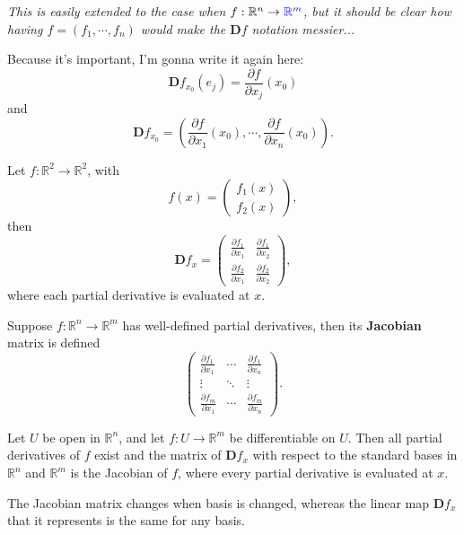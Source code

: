 \documentclass[10pt]{report}
\begin{document}
\textit{This is easily extended to the case when $f: \mathbb{R}^n \to {\color{blue}\mathbb{R}^m}$, but it should be clear how having $f=(f_1, \cdots, f_n)$ would make the $\mathbf{D}f$ notation messier...}

\begin{note}[]
Because it's important, I'm gonna write it again here:
\[
	\mathbf{D}f_{x_0}(e_j) = \frac{\partial f}{\partial x_j} (x_0)
\] 
and
\[
\mathbf{D}f_{x_0} = \left( \frac{\partial f}{\partial x_1} (x_0), \cdots, \frac{\partial f}{\partial x_n} (x_0) \right).
\] 
\end{note}

\begin{ex}[]
Let $f: \mathbb{R}^2 \to \mathbb{R}^2$, with
\[
	f(x) = 
	\begin{pmatrix}
		f_1(x) \\
		f_2(x)
	\end{pmatrix},
\] then
\[
\mathbf{D}f_{x} =
\begin{pmatrix}
	\frac{\partial f_1}{\partial x_1} & \frac{\partial f_1}{\partial x_2} \\
	\frac{\partial f_2}{\partial x_1} & \frac{\partial f_2}{\partial x_2}
\end{pmatrix},
\] where each partial derivative is evaluated at $x$.
\end{ex}

\begin{defn}[]
Suppose $f:\mathbb{R}^n \to \mathbb{R}^m$ has well-defined partial derivatives, then its \textbf{Jacobian} matrix is defined
\[
\begin{pmatrix}
	\frac{\partial f_1}{\partial x_1} & \cdots & \frac{\partial f_1}{\partial x_n} \\
	\vdots & \ddots & \vdots \\
	\frac{\partial f_m}{\partial x_1} & \cdots & \frac{\partial f_m}{\partial x_n} 
\end{pmatrix}.
\] 
\end{defn}

\begin{thrm}[]
Let $U$ be open in $\mathbb{R}^n$, and let $f:U \to \mathbb{R}^m$ be differentiable on $U$. Then all partial derivatives of $f$ exist and the matrix of $\mathbf{D}f_{x}$ with respect to the standard bases in $\mathbb{R}^n$ and $\mathbb{R}^m$ is the Jacobian of $f$, where every partial derivative is evaluated at $x$.
\end{thrm}

\begin{note}[]
The Jacobian matrix changes when basis is changed, whereas the linear map $\mathbf{D}f_x$ that it represents is the same for any basis.
\end{note}
\end{document}
